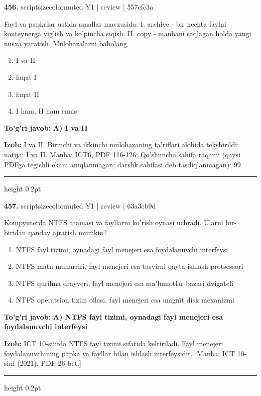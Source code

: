 \documentclass[10pt,a4paper]{article}
\begin{document}
{\bfseries\sffamily\color{ink} 456.} {scriptsizecolor{muted} Y1 | review | 557cfc3a}
\par
Fayl va papkalar ustida amallar mavzusida: I. archive - bir nechta faylni konteynerga yig'ish va ko'pincha siqish. II. copy - manbani saqlagan holda yangi nusxa yaratish. Mulohazalarni baholang.
\begin{enumerate}[label=\Alph*),leftmargin=9mm]
\item I va II
\item faqat I
\item faqat II
\item I ham, II ham emas
\end{enumerate}
\begin{tcolorbox}[enhanced,breakable,colback=teal!4,colframe=teal!60!black,boxrule=0.45pt,arc=1.2mm,left=2.7mm,right=2.7mm,top=1.8mm,bottom=1.8mm,before skip=2mm,after skip=2mm]
{\bfseries\sffamily\color{teal}To'g'ri javob:} \textbf{A) I va II}
\par\smallskip
{\bfseries Izoh:} I va II. Birinchi va ikkinchi mulohazaning ta'riflari alohida tekshirildi; natija: I va II. Manba: ICT6, PDF 116-126; Qo'shimcha sahifa raqami (qaysi PDFga tegishli ekani aniqlanmagan; darslik sahifasi deb tasdiqlanmagan): 99
\end{tcolorbox}
\vspace{2mm}\hrule height 0.2pt\vspace{3mm}

{\bfseries\sffamily\color{ink} 457.} {scriptsizecolor{muted} Y1 | review | 63a3cb9d}
\par
Kompyuterda NTFS atamasi va fayllarni ko'rish oynasi uchradi. Ularni bir-biridan qanday ajratish mumkin?
\begin{enumerate}[label=\Alph*),leftmargin=9mm]
\item NTFS fayl tizimi, oynadagi fayl menejeri esa foydalanuvchi interfeysi
\item NTFS matn muharriri, fayl menejeri esa tasvirni qayta ishlash protsessori
\item NTFS qurilma drayveri, fayl menejeri esa ma'lumotlar bazasi dvigateli
\item NTFS operatsion tizim oilasi, fayl menejeri esa magnit disk mexanizmi
\end{enumerate}
\begin{tcolorbox}[enhanced,breakable,colback=teal!4,colframe=teal!60!black,boxrule=0.45pt,arc=1.2mm,left=2.7mm,right=2.7mm,top=1.8mm,bottom=1.8mm,before skip=2mm,after skip=2mm]
{\bfseries\sffamily\color{teal}To'g'ri javob:} \textbf{A) NTFS fayl tizimi, oynadagi fayl menejeri esa foydalanuvchi interfeysi}
\par\smallskip
{\bfseries Izoh:} ICT 10-sinfda NTFS fayl tizimi sifatida keltiriladi. Fayl menejeri foydalanuvchining papka va fayllar bilan ishlash interfeysidir. [Manba: ICT 10-sinf (2021), PDF 26-bet.]
\end{tcolorbox}
\vspace{2mm}\hrule height 0.2pt\vspace{3mm}
\end{document}
